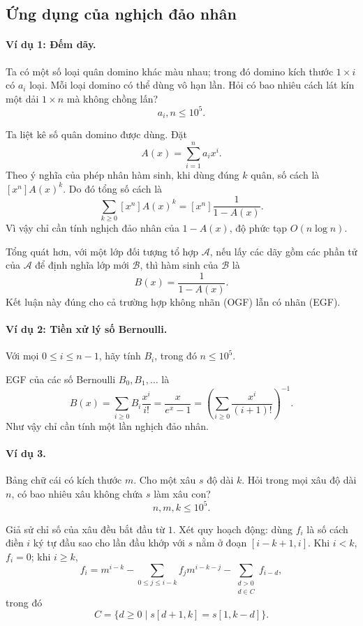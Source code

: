 \documentclass[11pt]{article}
\begin{document}
\subsection{Ứng dụng của nghịch đảo nhân}

\paragraph{Ví dụ 1: Đếm dãy.}
Ta có một số loại quân domino khác màu nhau; trong đó domino kích thước
\(1\times i\) có \(a_i\) loại. Mỗi loại domino có thể dùng vô hạn lần. Hỏi có
bao nhiêu cách lát kín một dải \(1\times n\) mà không chồng lấn?
\[
  a_i,n\le 10^5.
\]

Ta liệt kê số quân domino được dùng. Đặt
\[
  A(x)=\sum_{i=1}^n a_i x^i.
\]
Theo ý nghĩa của phép nhân hàm sinh, khi dùng đúng \(k\) quân, số cách là
\([x^n]A(x)^k\). Do đó tổng số cách là
\[
  \sum_{k\ge 0}[x^n]A(x)^k
  =[x^n]\frac1{1-A(x)}. \tag{5.1}
\]
Vì vậy chỉ cần tính nghịch đảo nhân của \(1-A(x)\), độ phức tạp
\(O(n\log n)\).

Tổng quát hơn, với một lớp đối tượng tổ hợp \(\mathcal A\), nếu lấy các dãy gồm
các phần tử của \(\mathcal A\) để định nghĩa lớp mới \(\mathcal B\), thì hàm
sinh của \(\mathcal B\) là
\[
  B(x)=\frac1{1-A(x)}. \tag{5.2}
\]
Kết luận này đúng cho cả trường hợp không nhãn (OGF) lẫn có nhãn (EGF).

\paragraph{Ví dụ 2: Tiền xử lý số Bernoulli.}
Với mọi \(0\le i\le n-1\), hãy tính \(B_i\), trong đó \(n\le 10^5\).

EGF của các số Bernoulli \(B_0,B_1,\ldots\) là
\[
  B(x)=\sum_{i\ge 0}B_i\frac{x^i}{i!}
  =\frac{x}{e^x-1}
  =\left(\sum_{i\ge 0}\frac{x^i}{(i+1)!}\right)^{-1}. \tag{5.3}
\]
Như vậy chỉ cần tính một lần nghịch đảo nhân.

\paragraph{Ví dụ 3.}
Bảng chữ cái có kích thước \(m\). Cho một xâu \(s\) độ dài \(k\). Hỏi trong mọi
xâu độ dài \(n\), có bao nhiêu xâu không chứa \(s\) làm xâu con?
\[
  n,m,k\le 10^5.
\]

Giả sử chỉ số của xâu đều bắt đầu từ \(1\). Xét quy hoạch động: dùng \(f_i\) là
số cách điền \(i\) ký tự đầu sao cho lần đầu khớp với \(s\) nằm ở đoạn
\([i-k+1,i]\). Khi \(i<k\), \(f_i=0\); khi \(i\ge k\),
\[
  f_i=m^{i-k}
  -\sum_{0\le j\le i-k} f_jm^{i-k-j}
  -\sum_{\substack{d>0\\ d\in C}} f_{i-d}, \tag{5.4}
\]
trong đó
\[
  C=\{d\ge 0\mid s[d+1,k]=s[1,k-d]\}.
\]
\end{document}
